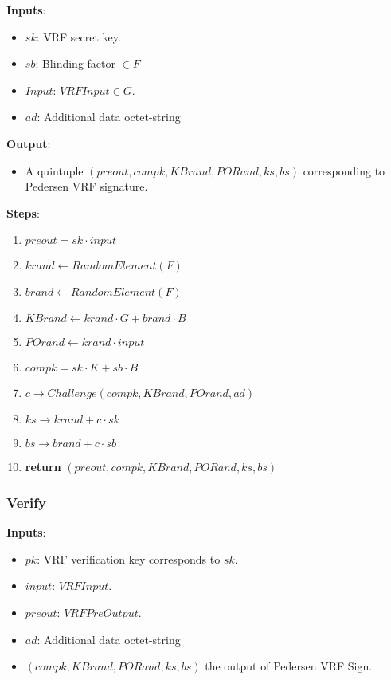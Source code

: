 \documentclass[
]{article}
\providecommand{\tightlist}{%
  \setlength{\itemsep}{0pt}\setlength{\parskip}{0pt}}
\begin{document}
\textbf{Inputs}:

\begin{itemize}
\tightlist
\item
  \(sk\): VRF secret key.
\item
  \(sb\): Blinding factor \(\in F\)
\item
  \(Input\): \(VRFInput \in G\).
\item
  \(ad\): Additional data octet-string
\end{itemize}

\textbf{Output}:

\begin{itemize}
\tightlist
\item
  A quintuple \((preout, compk, KBrand, PORand, ks, bs)\) corresponding
  to Pedersen VRF signature.
\end{itemize}

\textbf{Steps}:

\begin{enumerate}
\def\labelenumi{\arabic{enumi}.}
\tightlist
\item
  \(preout = sk \cdot input\)
\item
  \(krand \leftarrow RandomElement(F)\)
\item
  \(brand \leftarrow RandomElement(F)\)
\item
  \(KBrand \leftarrow krand \cdot G + brand \cdot B\)
\item
  \(POrand \leftarrow krand \cdot input\)
\item
  \(compk = sk \cdot K + sb \cdot B\)
\item
  \(c \rightarrow Challenge(compk, KBrand, POrand, ad)\)
\item
  \(ks \rightarrow krand + c \cdot sk\)
\item
  \(bs \rightarrow brand + c \cdot sb\)
\item
  \textbf{return} \((preout, compk, KBrand, PORand, ks, bs)\)
\end{enumerate}

\hypertarget{verify}{%
\subsubsection{Verify}\label{verify}}

\textbf{Inputs}:

\begin{itemize}
\tightlist
\item
  \(pk\): VRF verification key corresponds to \(sk\).
\item
  \(input\): \(VRFInput\).
\item
  \(preout\): \(VRFPreOutput\).
\item
  \(ad\): Additional data octet-string
\item
  \((compk, KBrand, PORand, ks, bs)\) the output of Pedersen VRF Sign.
\end{itemize}
\end{document}
